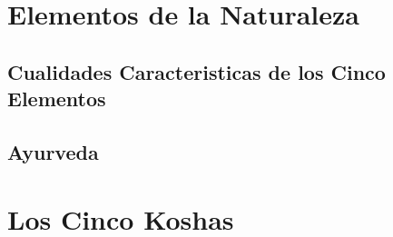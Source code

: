 \section{Elementos de la Naturaleza}
\subsection{Cualidades Caracteristicas de los Cinco Elementos}
\subsection{Ayurveda}
\section{Los Cinco Koshas}
